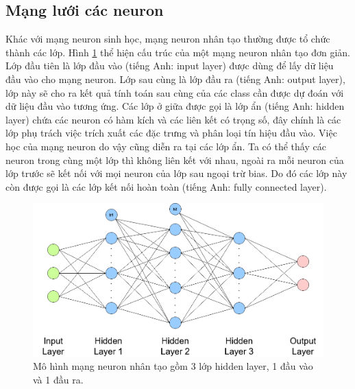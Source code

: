 \subsection{Mạng lưới các neuron}
Khác với mạng neuron sinh học, mạng neuron nhân tạo thường được tổ chức thành các lớp. Hình \ref{fig:nn} thể hiện cấu trúc của một mạng neuron nhân tạo đơn giản. Lớp đầu tiên là lớp đầu vào (tiếng Anh: input layer) được dùng để lấy dữ liệu đầu vào cho mạng neuron. Lớp sau cùng là lớp đầu ra (tiếng Anh: output layer), lớp này sẽ cho ra kết quả tính toán sau cùng của các class cần được dự đoán với dữ liệu đầu vào tương ứng. Các lớp ở giữa được gọi là lớp ẩn (tiếng Anh: hidden layer) chứa các neuron có hàm kích và các liên kết có trọng số, đây chính là các lớp phụ trách việc trích xuất các đặc trưng và phân loại tín hiệu đầu vào. Việc học của mạng neuron do vậy cũng diễn ra tại các lớp ẩn. Ta có thể thấy các neuron trong cùng một lớp thì không liên kết với nhau, ngoài ra mỗi neuron của lớp trước sẽ kết nối với mọi neuron của lớp sau ngoại trừ bias. Do đó các lớp này còn được gọi là các lớp kết nối hoàn toàn (tiếng Anh: fully connected layer).
\begin{figure}[ht!]
	\centerline{\includegraphics[scale=0.4]{images/nn.png}}
  	\caption{Mô hình mạng neuron nhân tạo gồm 3 lớp hidden layer, 1 đầu vào và 1 đầu ra.}
  	\label{fig:nn}
\end{figure}

